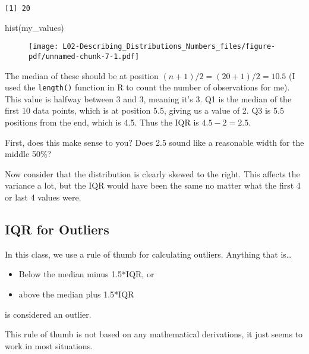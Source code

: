 \documentclass[
  letterpaper,
  DIV=11,
  numbers=noendperiod]{scrreprt}
\newenvironment{Shaded}{\begin{snugshade}}{\end{snugshade}}
\newcommand{\FunctionTok}[1]{\textcolor[rgb]{0.28,0.35,0.67}{#1}}
\newcommand{\NormalTok}[1]{\textcolor[rgb]{0.00,0.23,0.31}{#1}}
\providecommand{\tightlist}{%
  \setlength{\itemsep}{0pt}\setlength{\parskip}{0pt}}\usepackage{longtable,booktabs,array}
\begin{document}
\begin{verbatim}
[1] 20
\end{verbatim}

\begin{Shaded}
\begin{Highlighting}[]
\FunctionTok{hist}\NormalTok{(my\_values)}
\end{Highlighting}
\end{Shaded}

\begin{figure}[H]

{\centering \texttt{[image: L02-Describing\_Distributions\_Numbers\_files/figure-pdf/unnamed-chunk-7-1.pdf]}

}

\end{figure}

The median of these should be at position
\((n+1)/2 = (20 + 1)/2 = 10.5\) (I used the \texttt{length()} function
in R to count the number of observations for me). This value is halfway
between 3 and 3, meaning it's 3. Q1 is the median of the first 10 data
points, which is at position 5.5, giving us a value of 2. Q3 is 5.5
positions from the end, which is 4.5. Thus the IQR is \(4.5 - 2 = 2.5\).

First, does this make sense to you? Does 2.5 sound like a reasonable
width for the middle 50\%?

Now consider that the distribution is clearly skewed to the right. This
affects the variance a lot, but the IQR would have been the same no
matter what the first 4 or last 4 values were.

\hypertarget{iqr-for-outliers}{%
\subsection{IQR for Outliers}\label{iqr-for-outliers}}

In this class, we use a rule of thumb for calculating outliers. Anything
that is\ldots{}

\begin{itemize}
\tightlist
\item
  Below the median minus 1.5*IQR, or
\item
  above the median plus 1.5*IQR
\end{itemize}

is considered an outlier.

This rule of thumb is not based on any mathematical derivations, it just
seems to work in most situations.
\end{document}
